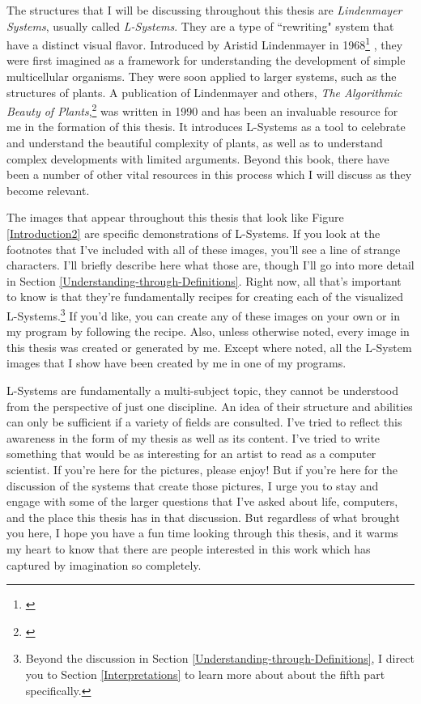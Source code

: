 \documentclass[12pt,twoside]{reedthesis}
\begin{document}
The structures that I will be discussing throughout this thesis are \textit{Lindenmayer Systems}, usually called \textit{L-Systems}. They are a type of ``rewriting" system that have a distinct visual flavor. Introduced by Aristid Lindenmayer in 1968\footnote{\cite{OG1967}} , they were first imagined as a framework for understanding the development of simple multicellular organisms. They were soon applied to larger systems, such as the structures of plants. A publication of Lindenmayer and others, \textit{The Algorithmic Beauty of Plants},\footnote{\cite{ABOP1990}} was written in 1990 and has been an invaluable resource for me in the formation of this thesis. It introduces L-Systems as a tool to celebrate and understand the beautiful complexity of plants, as well as to understand complex developments with limited arguments. Beyond this book, there have been a number of other vital resources in this process which I will discuss as they become relevant.

The images that appear throughout this thesis that look like Figure \ref{Introduction2} are specific demonstrations of L-Systems. If you look at the footnotes that I've included with all of these images, you'll see a line of strange characters. I'll briefly describe here what those are, though I'll go into more detail in Section \ref{Understanding-through-Definitions}. Right now, all that's important to know is that they're fundamentally recipes for creating each of the visualized L-Systems.\footnote{Beyond the discussion in Section \ref{Understanding-through-Definitions}, I direct you to Section \ref{Interpretations} to learn more about about the fifth part specifically.} If you'd like, you can create any of these images on your own or in my program by following the recipe.  Also, unless otherwise noted, every image in this thesis was created or generated by me. Except where noted, all the L-System images that I show have been created by me in one of my programs. 

L-Systems are fundamentally a multi-subject topic, they cannot be understood from the perspective of just one discipline. An idea of their structure and abilities can only be sufficient if a variety of fields are consulted. I've tried to reflect this awareness in the form of my thesis as well as its content. I've tried to write something that would be as interesting for an artist to read as a computer scientist. If you're here for the pictures, please enjoy! But if you're here for the discussion of the systems that create those pictures, I urge you to stay and engage with some of the larger questions that I've asked about life, computers, and the place this thesis has in that discussion. But regardless of what brought you here, I hope you have a fun time looking through this thesis, and it warms my heart to know that there are people interested in this work which has captured by imagination so completely.
\end{document}

